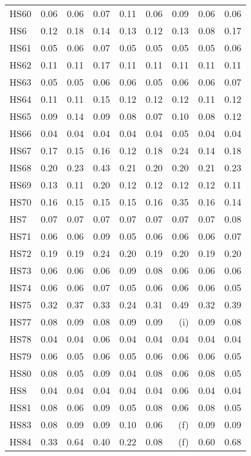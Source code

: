 \documentclass[11pt,twoside]{article}
\begin{document}
{\begin{longtable}[c]{|l|r|r|r|r|r|r|r|r|}
HS60 & 0.06 & 0.06 & 0.07 & 0.11 & 0.06 & 0.09 & 0.06 & 0.06 \\
HS6 & 0.12 & 0.18 & 0.14 & 0.13 & 0.12 & 0.13 & 0.08 & 0.17 \\
HS61 & 0.05 & 0.06 & 0.07 & 0.05 & 0.05 & 0.05 & 0.05 & 0.06 \\
HS62 & 0.11 & 0.11 & 0.17 & 0.11 & 0.11 & 0.11 & 0.11 & 0.11 \\
HS63 & 0.05 & 0.05 & 0.06 & 0.06 & 0.05 & 0.06 & 0.06 & 0.07 \\
HS64 & 0.11 & 0.11 & 0.15 & 0.12 & 0.12 & 0.12 & 0.11 & 0.12 \\
HS65 & 0.09 & 0.14 & 0.09 & 0.08 & 0.07 & 0.10 & 0.08 & 0.12 \\
HS66 & 0.04 & 0.04 & 0.04 & 0.04 & 0.04 & 0.05 & 0.04 & 0.04 \\
HS67 & 0.17 & 0.15 & 0.16 & 0.12 & 0.18 & 0.24 & 0.14 & 0.18 \\
HS68 & 0.20 & 0.23 & 0.43 & 0.21 & 0.20 & 0.20 & 0.21 & 0.23 \\
HS69 & 0.13 & 0.11 & 0.20 & 0.12 & 0.12 & 0.12 & 0.12 & 0.11 \\
HS70 & 0.16 & 0.15 & 0.15 & 0.15 & 0.16 & 0.35 & 0.16 & 0.14 \\
HS7 & 0.07 & 0.07 & 0.07 & 0.07 & 0.07 & 0.07 & 0.07 & 0.08 \\
HS71 & 0.06 & 0.06 & 0.09 & 0.05 & 0.06 & 0.06 & 0.06 & 0.07 \\
HS72 & 0.19 & 0.19 & 0.24 & 0.20 & 0.19 & 0.20 & 0.19 & 0.20 \\
HS73 & 0.06 & 0.06 & 0.06 & 0.09 & 0.08 & 0.06 & 0.06 & 0.06 \\
HS74 & 0.06 & 0.06 & 0.07 & 0.05 & 0.06 & 0.06 & 0.06 & 0.05 \\
HS75 & 0.32 & 0.37 & 0.33 & 0.24 & 0.31 & 0.49 & 0.32 & 0.39 \\
HS77 & 0.08 & 0.09 & 0.08 & 0.09 & 0.09 & (i) & 0.09 & 0.08 \\
HS78 & 0.04 & 0.04 & 0.06 & 0.04 & 0.04 & 0.04 & 0.04 & 0.04 \\
HS79 & 0.06 & 0.05 & 0.06 & 0.05 & 0.06 & 0.06 & 0.06 & 0.05 \\
HS80 & 0.08 & 0.05 & 0.09 & 0.04 & 0.08 & 0.06 & 0.08 & 0.05 \\
HS8 & 0.04 & 0.04 & 0.04 & 0.04 & 0.04 & 0.06 & 0.04 & 0.04 \\
HS81 & 0.08 & 0.06 & 0.09 & 0.05 & 0.08 & 0.06 & 0.08 & 0.05 \\
HS83 & 0.08 & 0.09 & 0.09 & 0.10 & 0.06 & (f) & 0.09 & 0.09 \\
HS84 & 0.33 & 0.64 & 0.40 & 0.22 & 0.08 & (f) & 0.60 & 0.68 \\

\end{longtable}}
\end{document}
